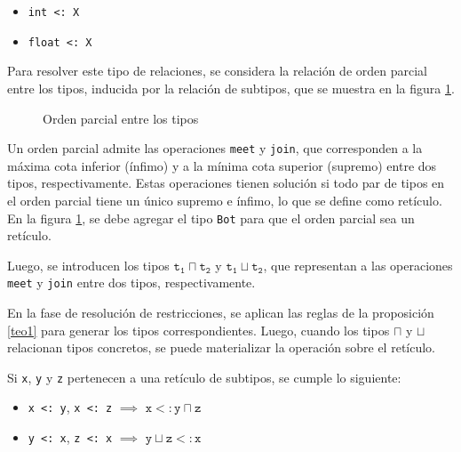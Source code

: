 \begin{itemize}
  \item \texttt{int <: X}
  \item \texttt{float <: X}
\end{itemize}


Para resolver este tipo de relaciones, se considera la relación de orden parcial entre los tipos, inducida por la relación de subtipos, que se muestra en la figura \ref{subt1}.

\begin{figure}[ht]
  \centering
  \caption{Orden parcial entre los tipos}
  \label{subt1}
\end{figure}

Un orden parcial admite las operaciones \texttt{meet} y \texttt{join}, que corresponden a la máxima cota inferior (ínfimo) y a la mínima cota superior (supremo) entre dos tipos, respectivamente. Estas operaciones tienen solución si todo par de tipos en el orden parcial tiene un único supremo e ínfimo, lo que se define como retículo. En la figura \ref{subt1}, se debe agregar el tipo \texttt{Bot} para que el orden parcial sea un retículo.

Luego, se introducen los tipos $\mathtt{t_1 \sqcap t_2}$ y $\mathtt{t_1 \sqcup t_2}$, que representan a las operaciones \texttt{meet} y \texttt{join} entre dos tipos, respectivamente.

En la fase de resolución de restricciones, se aplican las reglas de la proposición \ref{teo1} para generar los tipos correspondientes. Luego, cuando los tipos $\sqcap$ y $\sqcup$ relacionan tipos concretos, se puede materializar la operación sobre el retículo.


\begin{prop} \label{teo1} \normalfont Si \texttt{x}, \texttt{y} y \texttt{z} pertenecen a una retículo de subtipos, se cumple lo siguiente: \\
  \begin{itemize}
    \item \texttt{x <: y}, \texttt{x <: z} $\implies$ $\mathtt{x <: y \sqcap z}$
    \item \texttt{y <: x}, \texttt{z <: x} $\implies$ $\mathtt{y \sqcup z <: x}$
  \end{itemize}
\end{prop}

